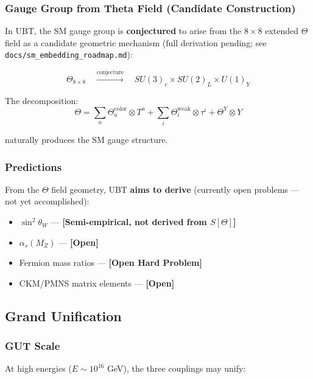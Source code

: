 \subsubsection{Gauge Group from Theta Field (Candidate Construction)}

In UBT, the SM gauge group is \textbf{conjectured} to arise from the $8 \times 8$ extended $\Theta$ field as a candidate geometric mechanism (full derivation pending; see \texttt{docs/sm\_embedding\_roadmap.md}):

\begin{equation}
\Theta_{8 \times 8} \quad \xrightarrow{\text{conjecture}} \quad SU(3)_c \times SU(2)_L \times U(1)_Y
\end{equation}

The decomposition:
\begin{equation}
\Theta = \sum_a \Theta_a^{\text{color}} \otimes T^a + \sum_i \Theta_i^{\text{weak}} \otimes \tau^i + \Theta^Y \otimes Y
\end{equation}

naturally produces the SM gauge structure.

\subsubsection{Predictions}

From the $\Theta$ field geometry, UBT \textbf{aims to derive}
(currently open problems — not yet accomplished):
\begin{itemize}
    \item $\sin^2\theta_W$ — \textbf{[Semi-empirical, not derived from $S[\Theta]$]}
    \item $\alpha_s(M_Z)$ — \textbf{[Open]}
    \item Fermion mass ratios — \textbf{[Open Hard Problem]}
    \item CKM/PMNS matrix elements — \textbf{[Open]}
\end{itemize}

\subsection{Grand Unification}

\subsubsection{GUT Scale}

At high energies ($E \sim 10^{16}$ GeV), the three couplings may unify:

